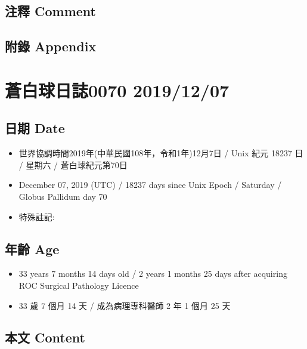 \documentclass[a5paper, 12pt
]{book}
\providecommand{\tightlist}{%
  \setlength{\itemsep}{0pt}\setlength{\parskip}{0pt}}
\begin{document}
\hypertarget{ux6ce8ux91cb-comment-5}{%
\subsection{注釋 Comment}\label{ux6ce8ux91cb-comment-5}}

\hypertarget{ux9644ux9304-appendix-5}{%
\subsection{附錄 Appendix}\label{ux9644ux9304-appendix-5}}

\hypertarget{ux84bcux767dux7403ux65e5ux8a8c0070-20191207}{%
\section{蒼白球日誌0070
2019/12/07}\label{ux84bcux767dux7403ux65e5ux8a8c0070-20191207}}

\hypertarget{ux65e5ux671f-date-6}{%
\subsection{日期 Date}\label{ux65e5ux671f-date-6}}

\begin{itemize}
\tightlist
\item
  世界協調時間2019年(中華民國108年，令和1年)12月7日 / Unix 紀元 18237 日
  / 星期六 / 蒼白球紀元第70日
\item
  December 07, 2019 (UTC) / 18237 days since Unix Epoch / Saturday /
  Globus Pallidum day 70
\item
  特殊註記:
\end{itemize}

\hypertarget{ux5e74ux9f61-age-6}{%
\subsection{年齡 Age}\label{ux5e74ux9f61-age-6}}

\begin{itemize}
\tightlist
\item
  33 years 7 months 14 days old / 2 years 1 months 25 days after
  acquiring ROC Surgical Pathology Licence
\item
  33 歲 7 個月 14 天 / 成為病理專科醫師 2 年 1 個月 25 天
\end{itemize}

\hypertarget{ux672cux6587-content-6}{%
\subsection{本文 Content}\label{ux672cux6587-content-6}}
\end{document}
